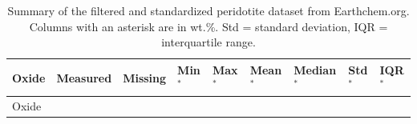\documentclass[draft,linenumbers]{agujournal2018}
\begin{document}
\begin{longtable}[]{@{}
  >{\raggedright\arraybackslash}p{}
  >{\raggedleft\arraybackslash}p{}
  >{\raggedleft\arraybackslash}p{}
  >{\raggedleft\arraybackslash}p{}
  >{\raggedleft\arraybackslash}p{}
  >{\raggedleft\arraybackslash}p{}
  >{\raggedleft\arraybackslash}p{}
  >{\raggedleft\arraybackslash}p{}
  >{\raggedleft\arraybackslash}p{}@{}}
\caption{\label{tab:earthchem-counts} Summary of the filtered and standardized peridotite dataset from Earthchem.org. Columns with an asterisk are in wt.\%. Std = standard deviation, IQR = interquartile range.}\tabularnewline
\toprule\noalign{}
\begin{minipage}[b]{\linewidth}\raggedright
Oxide
\end{minipage} & \begin{minipage}[b]{\linewidth}\raggedleft
Measured
\end{minipage} & \begin{minipage}[b]{\linewidth}\raggedleft
Missing
\end{minipage} & \begin{minipage}[b]{\linewidth}\raggedleft
Min\(^{*}\)
\end{minipage} & \begin{minipage}[b]{\linewidth}\raggedleft
Max\(^{*}\)
\end{minipage} & \begin{minipage}[b]{\linewidth}\raggedleft
Mean\(^{*}\)
\end{minipage} & \begin{minipage}[b]{\linewidth}\raggedleft
Median\(^{*}\)
\end{minipage} & \begin{minipage}[b]{\linewidth}\raggedleft
Std\(^{*}\)
\end{minipage} & \begin{minipage}[b]{\linewidth}\raggedleft
IQR\(^{*}\)
\end{minipage} \\
\midrule\noalign{}
\endfirsthead
\toprule\noalign{}
\begin{minipage}[b]{\linewidth}\raggedright
Oxide
\end{minipage} & \begin{minipage}[b]{\linewidth}\raggedleft

\end{minipage}
\end{longtable}
\end{document}

